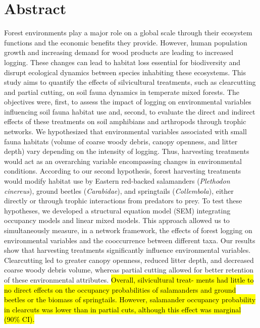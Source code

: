 \chapter*{Abstract}             %
\label{chap-abstract}           %

Forest environments play a major role on a global scale through their ecosystem functions and the economic benefits they provide. 
However, human population growth and increasing demand for wood products are leading to increased logging. 
These changes can lead to habitat loss essential for biodiversity and disrupt ecological dynamics between species inhabiting these ecosystems. 
This study aims to quantify the effects of silvicultural treatments, such as clearcutting and partial cutting, on soil fauna dynamics in temperate mixed forests. 
The objectives were, first, to assess the impact of logging on environmental variables influencing soil fauna habitat use and, second, 
to evaluate the direct and indirect effects of these treatments on soil amphibians and arthropods through trophic networks. 
We hypothesized that environmental variables associated with small fauna habitats (volume of coarse woody debris, canopy openness, and litter depth) vary depending on the intensity of logging. 
Thus, harvesting treatments would act as an overarching variable encompassing changes in environmental conditions. 
According to our second hypothesis, forest harvesting treatments would modify habitat use by Eastern red-backed salamanders (\textit{Plethodon cinereus}), ground beetles (\textit{Carabidae}), and springtails (\textit{Collembola}), 
either directly or through trophic interactions from predators to prey. 
To test these hypotheses, we developed a structural equation model (SEM) integrating occupancy models and linear mixed models. 
This approach allowed us to simultaneously measure, in a network framework, the effects of forest logging on environmental variables and the cooccurrence between different taxa. 
Our results show that harvesting treatments significantly influence environmental variables. 
Clearcutting led to greater canopy openness, reduced litter depth, and decreased coarse woody debris volume,  
whereas partial cutting allowed for better retention of these environmental attributes. 
\hl{Overall, silvicultural treat- ments had little to no direct effects on the occupancy probabilities of salamanders and ground beetles or the biomass of springtails. 
However, salamander occupancy probability in clearcuts was lower than in partial cuts, although this effect was marginal (90\% CI).}
